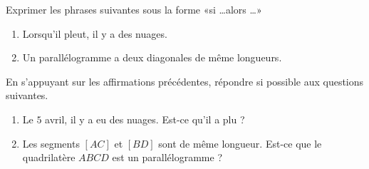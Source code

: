 
\begin{exercice}\label{exosmath-0782}

    Exprimer les phrases suivantes sous la forme «si \ldots alors \ldots» 
    \begin{enumerate}
        \item
            Lorsqu'il pleut, il y a des nuages.
        \item
            Un parallélogramme a deux diagonales de même longueurs.
    \end{enumerate}
    En s'appuyant sur les affirmations précédentes, répondre si possible aux questions suivantes.
    \begin{enumerate}
        \item
            Le \( 5\) avril, il y a eu des nuages. Est-ce qu'il a plu ?
        \item
            Les segments \( [AC]\) et \( [BD]\) sont de même longueur. Est-ce que le quadrilatère \( ABCD\) est un parallélogramme ?
    \end{enumerate}

\end{exercice}
